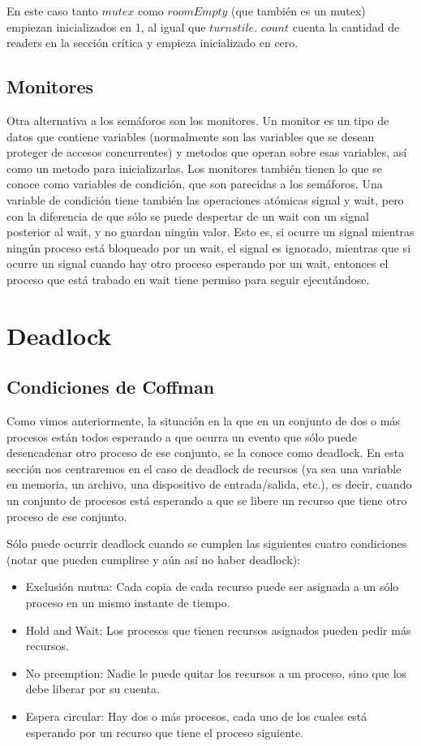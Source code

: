 \documentclass{article}
\begin{document}
En este caso tanto $mutex$ como $roomEmpty$ (que tambi\'en es un mutex) empiezan inicializados en 1, al igual que $turnstile$. $count$ cuenta la cantidad de readers en la secci\'on cr\'itica y empieza inicializado en cero.

\subsection{Monitores}

Otra alternativa a los sem\'aforos son los monitores. Un monitor es un tipo de datos que contiene variables (normalmente son las variables que se desean proteger de accesos concurrentes) y metodos que operan sobre esas variables, as\'i como un metodo para inicializarlas. Los monitores tambi\'en tienen lo que se conoce como variables de condici\'on, que son parecidas a los sem\'aforos. Una variable de condici\'on tiene tambi\'en las operaciones at\'omicas signal y wait, pero con la diferencia de que s\'olo se puede despertar de un wait con un signal posterior al wait, y no guardan ning\'un valor. Esto es, si ocurre un signal mientras ning\'un proceso est\'a bloqueado por un wait, el signal es ignorado, mientras que si ocurre un signal cuando hay otro proceso esperando por un wait, entonces el proceso que est\'a trabado en wait tiene permiso para seguir ejecut\'andose.

\section{Deadlock}

\subsection{Condiciones de Coffman}

Como vimos anteriormente, la situaci\'on en la que en un conjunto de dos o m\'as procesos est\'an todos esperando a que ocurra un evento que s\'olo puede desencadenar otro proceso de ese conjunto, se la conoce como deadlock. En esta secci\'on nos centraremos en el caso de deadlock de recursos (ya sea una variable en memoria, un archivo, una dispositivo de entrada/salida, etc.),  es decir, cuando un conjunto de procesos est\'a esperando a que se libere un recurso que tiene otro proceso de ese conjunto.

S\'olo puede ocurrir deadlock cuando se cumplen las siguientes cuatro condiciones (notar que pueden cumplirse y a\'un as\'i no haber deadlock):

\begin{itemize}
\item Exclusi\'on mutua: Cada copia de cada recurso puede ser asignada a un s\'olo proceso en un mismo instante de tiempo.
\item Hold and Wait: Los procesos que tienen recursos asignados pueden pedir m\'as recursos.
\item No preemption: Nadie le puede quitar los recursos a un proceso, sino que los debe liberar por su cuenta.
\item Espera circular: Hay dos o m\'as procesos, cada uno de los cuales est\'a esperando por un recurso que tiene el proceso siguiente.
\end{itemize}
\end{document}
